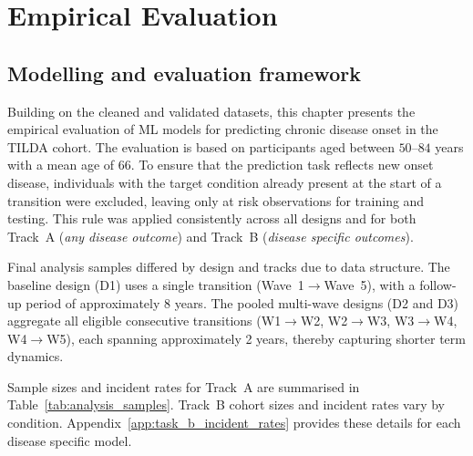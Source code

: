 
\ifpdf
    \graphicspath{{5_chapter5/figures/PNG/}{5_chapter5/figures/PDF/}{5_chapter5/figures/}}
\else
    \graphicspath{{5_chapter5/figures/EPS/}{5_chapter5/figures/}}
\fi

\chapter{Empirical Evaluation}\label{ch:chapter5}

\section{Modelling and evaluation framework}
Building on the cleaned and validated datasets, this chapter presents the empirical evaluation of \gls{ML} models for predicting chronic disease onset in the \gls{TILDA} cohort. The evaluation is based on participants aged between $50$--$84$ years with a mean age of $66$. To ensure that the prediction task reflects new onset disease, individuals with the target condition already present at the start of a transition were excluded, leaving only at risk observations for training and testing. This rule was applied consistently across all designs and for both Track~A (\emph{any disease outcome}) and Track~B (\emph{disease specific outcomes}).

Final analysis samples differed by design and tracks due to data structure. The baseline design (D1) uses a single transition (Wave~1$\rightarrow$Wave~5), with a follow-up period of approximately 8 years. The pooled multi-wave designs (D2 and D3) aggregate all eligible consecutive transitions (W1$\rightarrow$W2, W2$\rightarrow$W3, W3$\rightarrow$W4, W4$\rightarrow$W5), each spanning approximately 2 years, thereby capturing shorter term dynamics.

Sample sizes and incident rates for Track~A are summarised in Table~\ref{tab:analysis_samples}. Track~B cohort sizes and incident rates vary by condition. Appendix~\ref{app:task_b_incident_rates} provides these details for each disease specific model.

